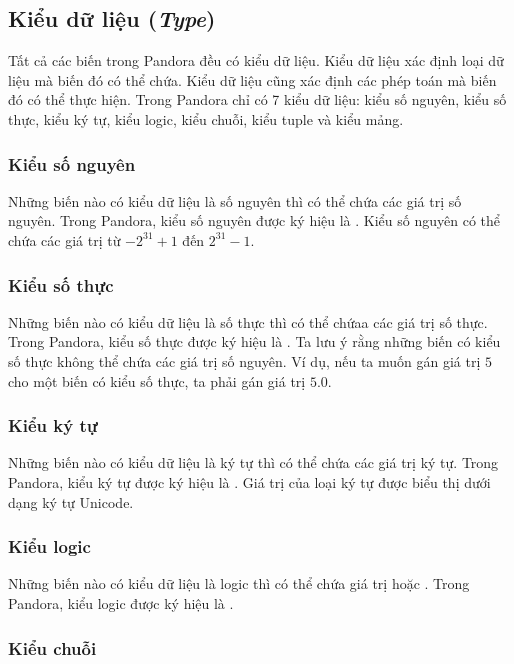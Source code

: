 \subsection{Kiểu dữ liệu (\textit{Type})}

    Tất cả các biến trong Pandora đều có kiểu dữ liệu. Kiểu dữ liệu xác định loại dữ liệu mà biến đó có thể chứa. Kiểu dữ liệu cũng xác định các phép toán mà biến đó có thể thực hiện. Trong Pandora chỉ có 7 kiểu dữ liệu: kiểu số nguyên, kiểu số thực, kiểu ký tự, kiểu logic, kiểu chuỗi, kiểu tuple và kiểu mảng.

\subsubsection{Kiểu số nguyên}

    Những biến nào có kiểu dữ liệu là số nguyên thì có thể chứa các giá trị số nguyên. Trong Pandora, kiểu số nguyên được ký hiệu là . Kiểu số nguyên có thể chứa các giá trị từ $-2^{31}+1$ đến $2^{31}-1$.

\subsubsection{Kiểu số thực}

    Những biến nào có kiểu dữ liệu là số thực thì có thể chứaa các giá trị số thực. Trong Pandora, kiểu số thực được ký hiệu là . Ta lưu ý rằng những biến có kiểu số thực không thể chứa các giá trị số nguyên. Ví dụ, nếu ta muốn gán giá trị $5$ cho một biến có kiểu số thực, ta phải gán giá trị $5.0$.

\subsubsection{Kiểu ký tự}

    Những biến nào có kiểu dữ liệu là ký tự thì có thể chứa các giá trị ký tự. Trong Pandora, kiểu ký tự được ký hiệu là . Giá trị của loại ký tự được biểu thị dưới dạng ký tự Unicode.

\subsubsection{Kiểu logic}

    Những biến nào có kiểu dữ liệu là logic thì có thể chứa giá trị  hoặc . Trong Pandora, kiểu logic được ký hiệu là .

\subsubsection{Kiểu chuỗi}

